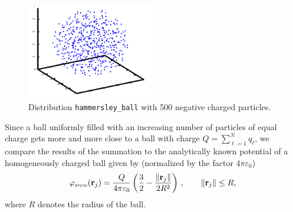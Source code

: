 \begin{figure}[ht]
  \centering
  \includegraphics[width=0.5\textwidth]{figures/hballneg_500}
  \caption{Distribution \texttt{hammersley\_{}ball} with 500 negative charged particles.}
\end{figure}

Since a ball uniformly filled with an increasing number of particles
of equal charge gets more and more close to a ball with charge
$Q=\sum_{\ell=1}^N q_\ell$, we compare the results of the summation to
the analytically known potential of a homogeneously charged ball given
by (normalized by the factor $4\pi\varepsilon_0$)
\[
  \varphi_{\mbox {\tiny asym}}(\mathbf r_j)
  = \frac{Q}{4\pi\varepsilon_0} \left(
    \frac{3}{2}-\frac{\|\mathbf r_j\|}{2 R^2}\right)\, ,\qquad \|\mathbf r_j\|\leq R,
\]
where $R$ denotes the radius of the ball.\par

